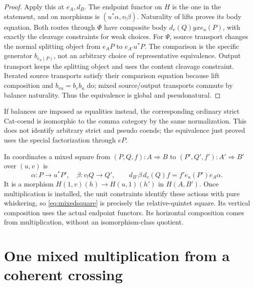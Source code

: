 \documentclass[11pt]{article}
\theoremstyle{definition}
\begin{document}
\begin{proof}
Apply this at $e_A,d_B$. The endpoint functor on $H$ is the one in the
statement, and on morphisms is $(u^*\alpha,v_!\beta)$. Naturality of lifts
proves its body equation. Both routes through $\Phi$ have composite body
$d_v(Q)yx e_u(P)$, with exactly the cleavage constraints for weak choices.
For $\Psi$, source transport changes the normal splitting object from
$e_AP$ to $e_{A'}u^*P$. The comparison is the specific generator
$b_{e_u(P)}$, not an arbitrary choice of representative equivalence.
Output transport keeps the splitting object and uses the content cleavage
constraint. Iterated source transports satisfy their comparison equation
because lift composition and $b_{vu}=b_vb_u$ do; mixed source/output
transports commute by balance naturality. Thus the equivalence is global
and pseudonatural.
\end{proof}

If balances are imposed as equalities instead, the corresponding ordinary
strict Cat-coend is isomorphic to the comma category by the same
normalization. This does not identify arbitrary strict and pseudo coends;
the equivalence just proved uses the special factorization through $eP$.

In coordinates a mixed square from $(P,Q,f):A\Rightarrow B$ to
$(P',Q',f'):A'\Rightarrow B'$ over $(u,v)$ is
\begin{equation}\label{eq:mixedsquare}
 \alpha:P\to u^*P',\quad \beta:v_!Q\to Q',\qquad
 d_{B'}\beta\,d_v(Q)f=f'e_u(P')e_A\alpha.
\end{equation}
It is a morphism $H(1,v)(h)\to H(u,1)(h')$ in $H(A,B')$.
Once multiplication is installed, the unit constraints identify these
actions with pure whiskering, so \eqref{eq:mixedsquare} is precisely the
relative-quintet square. Its vertical composition uses the actual endpoint
functors. Its horizontal composition comes from multiplication, without an
isomorphism-class quotient.

\section{One mixed multiplication from a coherent crossing}\label{sec:mixed}
\end{document}
